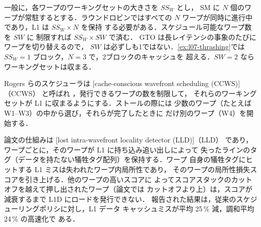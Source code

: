 \documentclass[../main.tex]{subfiles}
\begin{document}
一般に，各ワープのワーキングセットの大きさを $\mathit{SS}_W$ とし，
SM に $N$ 個のワープが常駐するとする．ラウンドロビンではすべての $N$
ワープが同時に進行中であり，L1 は $\mathit{SS}_W \times N$ を保持
する必要がある．スケジュール可能なワープ数を $\mathit{SW}$ に
制限すれば $\mathit{SS}_W \times \mathit{SW}$ で済む．
GTO は長レイテンシの事象のたびにワープを切り替えるので，
$\mathit{SW}$ は必ずしも1ではない．\cref{ex:l07-thrashing}では
$\mathit{SS}_W = 1$ ブロック，$N = 3$ で，2ブロックのキャッシュを
超える．$\mathit{SW} = 2$ ならワーキングセットは収まる．

\begin{definition}[キャッシュ考慮型ウェーブフロントスケジューリング]
  \label{def:l07-ccws}
  Rogers らのスケジューラは
  [cache-conscious wavefront scheduling (CCWS)]（CCWS）
  と呼ばれ \cite{rogers2012ccws}，発行できるワープの数を制限して，
  それらのワーキングセットが L1 に収まるようにする．ストールの際には
  少数のワープ（たとえば W1--W3）の中から選び，それらが完了したときに
  だけ別のワープ（W4）を開始する．
\end{definition}

%
論文の仕組みは
[lost intra-wavefront locality detector (LLD)]（LLD）
であり，ワープごとに，そのワープが L1 に持ち込み追い出しによって
失ったラインのタグ（データを持たない犠牲タグ配列）を保持する．ワープ
自身の犠牲タグにヒットする L1 ミスは失われたワープ内局所性であり，
そのワープの局所性損失スコアを引き上げる．他のワープの高いスコアに
よってスコアスタックのカットオフを越えて押し出されたワープ（論文では
カットオフより上）は，スコアが減衰するまで L1D にロードを発行できない．
報告された結果は，従来のスケジューリングポリシに対し，L1 データ
キャッシュミスが平均 25\,\% 減，調和平均 24\,\% の高速化で
ある．
\end{document}
